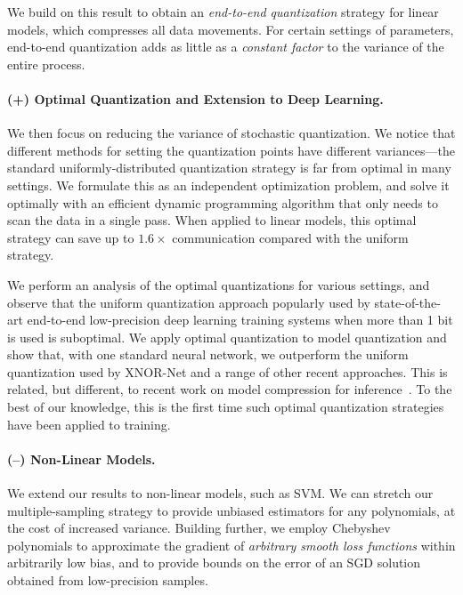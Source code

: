 \documentclass{article}
\begin{document}
\vspace{-0.5em}
We build on this result to obtain an \emph{end-to-end quantization} strategy
for linear models, which compresses all data movements. 
For certain settings of parameters, end-to-end quantization adds as little as a \emph{constant factor} to the variance of the entire process. 

\vspace{-1.5em}
\paragraph{(+) Optimal Quantization and Extension to Deep Learning.}
We then focus on reducing the variance of  
stochastic quantization. We notice that different methods for setting the quantization points have different variances---the standard uniformly-distributed quantization strategy is far from optimal in many settings.
We formulate this as an independent optimization problem, and solve it optimally with 
an efficient dynamic programming algorithm 
that only needs to scan the data in a single pass.
When applied to linear models, this optimal 
strategy can save up to $1.6\times$ communication
compared with the uniform strategy.

\vspace{-0.5em}
We perform an analysis of the optimal quantizations for various settings, and observe that the uniform quantization approach
popularly used by state-of-the-art end-to-end
low-precision deep learning training systems
when more than 1 bit is used is suboptimal.
We apply optimal quantization to 
model quantization and show that, with one
standard neural network, we outperform the
uniform quantization used by XNOR-Net and a
range of other recent approaches. This
is related, but different, to recent work 
on model compression for inference~\cite{Han:2016:ICLR}. 
To the best of our knowledge, this is the first time such optimal quantization strategies have been applied to training. 

\vspace{-1.5em}
\paragraph{(--) Non-Linear Models.} We extend our
results to non-linear models, such as SVM. We can stretch our multiple-sampling strategy to provide 
unbiased estimators for any polynomials, at the cost of increased variance. 
Building further, we employ Chebyshev polynomials to   
approximate the gradient of \emph{arbitrary smooth loss functions} within arbitrarily low bias, 
and to provide bounds on the error of an SGD solution obtained from low-precision samples. 
\end{document}
